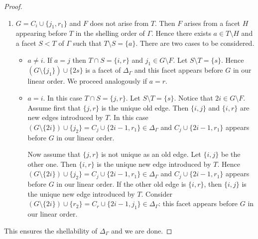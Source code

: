 \documentclass[10pt,a4paper]{amsart}
\begin{document}
\begin{proof}
\begin{enumerate}
    \item $G=C_i \cup \{j_1,r_1\}$ and $F$ does not arise from $T$. Then $F$ arises from a facet $H$ appearing before $T$ in the shelling order of $\Gamma$. Hence there exists $a \in T \setminus H$ and a facet $S<T$ of $\Gamma$ such that $T \setminus S=\{a\}$. There are two cases to be considered.
    \begin{itemize}
        \item $a\neq i$. If $a=j$ then $T \cap S=\{i,r\}$ and  $j_1 \in G \setminus F$. Let $S \setminus T=\{s\}$. Hence $(G \setminus \{j_1\}) \cup \{2s\}$ is a facet of  $\Delta_{\Gamma}$ and this facet appears before $G$ in our linear order. We proceed analogously if $a=r$. 
        \item $a=i$. In this case $T \cap S=\{j,r\}$. Let $S \setminus T=\{s\}$. 
        Notice that $2i \in G \setminus F$. 
        Assume first that  $\{j,r\}$ is the unique old edge. Then $\{i,j\}$ and $\{i,r\}$ are new edges introduced by $T$. In this case $(G \setminus \{2i\}) \cup \{j_2\}=C_j \cup \{2i-1,r_1\} \in \Delta_{\Gamma}$ and $C_j \cup \{2i-1,r_1\}$ 
        appears before $G$ in our linear order.

        Now assume that  $\{j,r\}$ is not unique as an old edge.
        Let $\{i,j\}$ be the other one. Then $\{i,r\}$ is the unique new edge introduced by $T$. 
        Hence $(G \setminus \{2i\}) \cup \{j_2\}=C_j \cup \{2i-1,r_1\} \in \Delta_{\Gamma}$ and $C_j \cup \{2i-1,r_1\}$  appears before $G$ in our linear order. 
        If the other old edge is $\{i,r\}$, then $\{i,j\}$ is the unique new edge introduced by $T$. Consider $(G \setminus \{2i\}) \cup \{r_2\}=C_r \cup \{2i-1,j_1\} \in \Delta_{\Gamma}$: this facet appears before $G$ in our linear order.
    \end{itemize} 
\end{enumerate}
This ensures the shellability of $\Delta_{\Gamma}$ and we are done.  
\end{proof}
\end{document}
